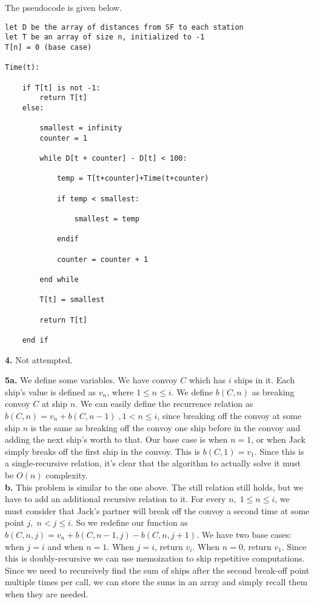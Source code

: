 \documentclass[12pt]{report}
\newcommand{\no}{\noindent}
\begin{document}
	\pagebreak

	\no The pseudocode is given below.
	
	\begin{lstlisting}
let D be the array of distances from SF to each station 
let T be an array of size n, initialized to -1
T[n] = 0 (base case)

Time(t):

	if T[t] is not -1:
		return T[t]
	else:
		
		smallest = infinity
		counter = 1
		
		while D[t + counter] - D[t] < 100:
		
			temp = T[t+counter]+Time(t+counter)
			
			if temp < smallest:
				
				smallest = temp
				
			endif
			
			counter = counter + 1
			
		end while
		
		T[t] = smallest
		
		return T[t]
		
	end if
	\end{lstlisting}

	\no \textbf{4.} Not attempted.\\
	
	\pagebreak
	
	\no \textbf{5a.} We define some variables. We have convoy $C$ which has $i$ ships in it. Each ship's value is defined as $v_n\text{, where }1 \leq n \leq i.$ We define $b(C,n)$ as breaking convoy $C$ at ship $n$. We can easily define the recurrence relation as $b(C,n) = v_n + b(C,n-1)\; , 1 < n \leq i$, since breaking off the convoy at some ship $n$ is the same as breaking off the convoy one ship before in the convoy and adding the next ship's worth to that. Our base case is when $n=1$, or when Jack simply breaks off the first ship in the convoy. This is $b(C,1) = v_1$. Since this is a single-recursive relation, it's clear that the algorithm to actually solve it must be $O(n)$ complexity.\\

	\no \textbf{b.} This problem is similar to the one above. The still relation still holds, but we have to add an additional recursive relation to it. For every $n,\;1 \leq n \leq i$, we must consider that Jack's partner will break off the convoy a second time at some point $j,\; n < j \leq i$. So we redefine our function as $b(C, n, j) = v_n + b(C,n-1,j) - b(C,n,j+1)$. We have two base cases: when $j=i$ and when $n=1$. When $j = i$, return $v_i$. When $n = 0$, return $v_1$. Since this is doubly-recursive we can use memoization to skip repetitive computations. Since we need to recursively find the sum of ships after the second break-off point multiple times per call, we can store the sums in an array and simply recall them when they are needed.
\end{document}
